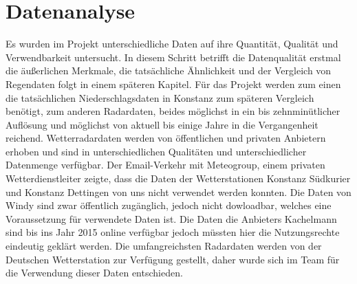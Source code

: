 
\section{Datenanalyse}
Es wurden im Projekt unterschiedliche Daten auf ihre Quantität, Qualität und Verwendbarkeit untersucht. In diesem Schritt betrifft die Datenqualität erstmal die äußerlichen Merkmale, die tatsächliche Ähnlichkeit und der Vergleich von Regendaten folgt in einem späteren Kapitel. 
Für das Projekt werden zum einen die tatsächlichen Niederschlagsdaten in Konstanz zum späteren Vergleich benötigt, zum anderen Radardaten, beides möglichst in ein bis zehnminütlicher Auflösung und möglichst von aktuell bis einige Jahre in die Vergangenheit reichend. 
Wetterradardaten werden von öffentlichen und privaten Anbietern erhoben und sind in unterschiedlichen Qualitäten und unterschiedlicher Datenmenge verfügbar. Der Email-Verkehr mit Meteogroup, einem privaten Wetterdienstleiter zeigte, dass die Daten der Wetterstationen Konstanz Südkurier und Konstanz Dettingen von uns nicht verwendet werden konnten. Die Daten von Windy sind zwar öffentlich zugänglich, jedoch nicht dowloadbar, welches eine Voraussetzung für verwendete Daten ist. Die Daten die Anbieters Kachelmann sind bis ins Jahr 2015 online verfügbar jedoch müssten hier die Nutzungsrechte eindeutig geklärt werden. 
Die umfangreichsten Radardaten werden von der Deutschen Wetterstation zur Verfügung gestellt, daher wurde sich im Team für die Verwendung dieser Daten entschieden. 


